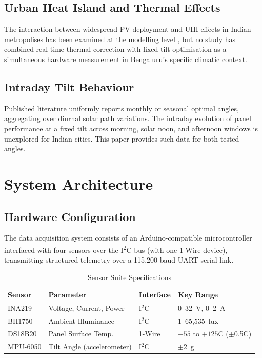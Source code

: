 \documentclass[conference]{IEEEtran}
\begin{document}
\subsection{Urban Heat Island and Thermal Effects}

The interaction between widespread PV deployment and UHI effects in Indian metropolises has been
examined at the modelling level \cite{sailor2011,taha1997}, but no study has combined real-time
thermal correction with fixed-tilt optimisation as a simultaneous hardware measurement in
Bengaluru's specific climatic context.

\subsection{Intraday Tilt Behaviour}

Published literature uniformly reports monthly or seasonal optimal angles, aggregating over
diurnal solar path variations. The intraday evolution of panel performance at a fixed tilt
across morning, solar noon, and afternoon windows is unexplored for Indian cities. This paper
provides such data for both tested angles.

\section{System Architecture}
\label{sec:sysarch}

\subsection{Hardware Configuration}

The data acquisition system consists of an Arduino-compatible microcontroller interfaced with
four sensors over the I\textsuperscript{2}C bus (with one 1-Wire device), transmitting
structured telemetry over a 115{,}200-baud UART serial link.

\begin{table}[H]
  \caption{Sensor Suite Specifications}
  \label{tab:sensors}
  \centering
  \renewcommand{\arraystretch}{1.2}
  \begin{tabular}{@{}p{1.6cm}p{2.2cm}p{1.0cm}p{2.4cm}@{}}
    \toprule
    Sensor & Parameter & Interface & Key Range \\
    \midrule
    INA219   & Voltage, Current, Power      & I$^2$C  & 0--32~V, 0--2~A \\
    BH1750   & Ambient Illuminance          & I$^2$C  & 1--65{,}535~lux \\
    DS18B20  & Panel Surface Temp.          & 1-Wire  & $-55$ to $+125$\degree{}C ($\pm$0.5\degree{}C) \\
    MPU-6050 & Tilt Angle (accelerometer)   & I$^2$C  & $\pm$2~g \\
    \bottomrule
  \end{tabular}
\end{table}
\end{document}
